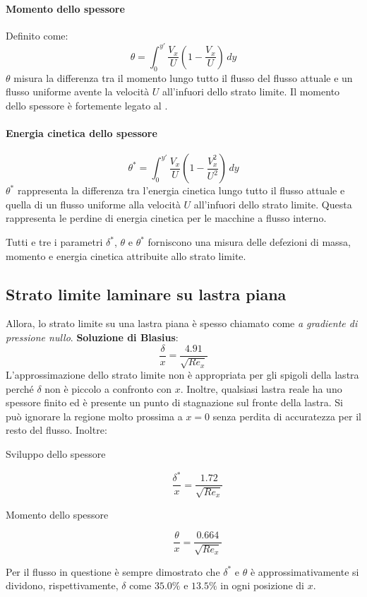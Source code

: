\paragraph{Momento dello spessore}
Definito come:
\begin{equation}
\theta = \int_0^{y'}{\frac{V_x}{U}\left(1-\frac{V_x}{U}\right)\,dy}
\end{equation}
$\theta$ misura la differenza tra il momento lungo tutto il flusso del flusso attuale e un flusso uniforme avente la velocità $U$ all'infuori dello strato limite.
Il momento dello spessore è fortemente legato al .

\paragraph{Energia cinetica dello spessore}
\begin{equation}
\theta^* = \int_0^{y'}{\frac{V_x}{U}\left(1-\frac{V_x^2}{U^2}\right)\,dy}
\end{equation}
$\theta^*$ rappresenta la differenza tra l'energia cinetica lungo tutto il flusso attuale e quella di un flusso uniforme alla velocità $U$ all'infuori dello strato limite.
Questa rappresenta le perdine di energia cinetica per le macchine a flusso interno.

Tutti e tre i parametri $\delta^*$, $\theta$ e $\theta^*$ forniscono una misura delle defezioni di massa, momento e energia cinetica attribuite allo strato limite.

\subsection{Strato limite laminare su lastra piana}
Allora, lo strato limite su una lastra piana è spesso chiamato come \textit{a gradiente di pressione nullo}.
\textbf{Soluzione di Blasius}:
\begin{equation}
\frac{\delta}{x} = \frac{4.91}{\sqrt{Re_x}}
\end{equation}
L'approssimazione dello strato limite non è appropriata per gli spigoli della lastra perché $\delta$ non è piccolo a confronto con $x$.
Inoltre, qualsiasi lastra reale ha uno spessore finito ed è presente un punto di stagnazione sul fronte della lastra.
Si può ignorare la regione molto prossima a $x=0$ senza perdita di accuratezza per il resto del flusso.
Inoltre:
\begin{description}
\item[Sviluppo dello spessore] 
\begin{equation}
\frac{\delta^*}{x} = \frac{1.72}{\sqrt{Re_x}}
\end{equation}
\item[Momento dello spessore]
\begin{equation}
\frac{\theta}{x} = \frac{0.664}{\sqrt{Re_x}}
\end{equation}
\end{description}
Per il flusso in questione è sempre dimostrato che $\delta^*$ e $\theta$ è approssimativamente si dividono, rispettivamente, $\delta$ come $35.0\%$ e $13.5\%$ in ogni posizione di $x$.

